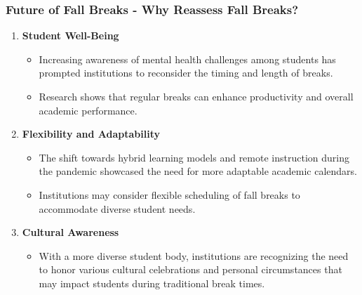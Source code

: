 \documentclass[aspectratio=169]{beamer}
\begin{document}
\begin{frame}[fragile]
    \frametitle{Future of Fall Breaks - Why Reassess Fall Breaks?}
    \begin{enumerate}
        \item \textbf{Student Well-Being}
        \begin{itemize}
            \item Increasing awareness of mental health challenges among students has prompted institutions to reconsider the timing and length of breaks. 
            \item Research shows that regular breaks can enhance productivity and overall academic performance.
        \end{itemize}
        
        \item \textbf{Flexibility and Adaptability}
        \begin{itemize}
            \item The shift towards hybrid learning models and remote instruction during the pandemic showcased the need for more adaptable academic calendars.
            \item Institutions may consider flexible scheduling of fall breaks to accommodate diverse student needs.
        \end{itemize}
        
        \item \textbf{Cultural Awareness}
        \begin{itemize}
            \item With a more diverse student body, institutions are recognizing the need to honor various cultural celebrations and personal circumstances that may impact students during traditional break times.
        \end{itemize}
    \end{enumerate}
\end{frame}
\end{document}
